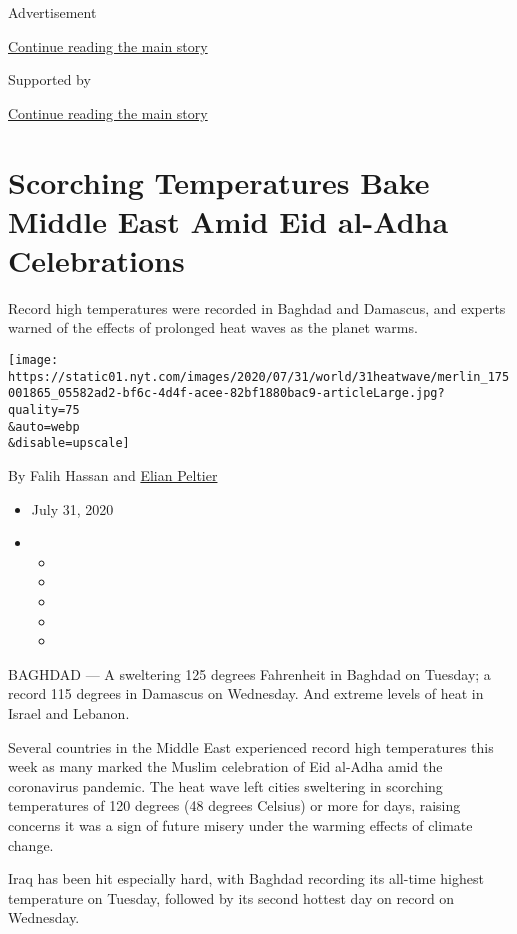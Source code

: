 Advertisement

\protect\hyperlink{after-top}{Continue reading the main story}

Supported by

\protect\hyperlink{after-sponsor}{Continue reading the main story}

\hypertarget{scorching-temperatures-bake-middle-east-amid-eid-al-adha-celebrations}{%
\section{Scorching Temperatures Bake Middle East Amid Eid al-Adha
Celebrations}\label{scorching-temperatures-bake-middle-east-amid-eid-al-adha-celebrations}}

Record high temperatures were recorded in Baghdad and Damascus, and
experts warned of the effects of prolonged heat waves as the planet
warms.

\texttt{[image: https://static01.nyt.com/images/2020/07/31/world/31heatwave/merlin\_175001865\_05582ad2-bf6c-4d4f-acee-82bf1880bac9-articleLarge.jpg?quality=75\\\&auto=webp\\\&disable=upscale]}

By Falih Hassan and
\href{https://www.nytimes.com/by/elian-peltier}{Elian Peltier}

\begin{itemize}
\item
  July 31, 2020
\item
  \begin{itemize}
  \item
  \item
  \item
  \item
  \item
  \end{itemize}
\end{itemize}

BAGHDAD --- A sweltering 125 degrees Fahrenheit in Baghdad on Tuesday; a
record 115 degrees in Damascus on Wednesday. And extreme levels of heat
in Israel and Lebanon.

Several countries in the Middle East experienced record high
temperatures this week as many marked the Muslim celebration of Eid
al-Adha amid the coronavirus pandemic. The heat wave left cities
sweltering in scorching temperatures of 120 degrees (48 degrees Celsius)
or more for days, raising concerns it was a sign of future misery under
the warming effects of climate change.

Iraq has been hit especially hard, with Baghdad recording its all-time
highest temperature on Tuesday, followed by its second hottest day on
record on Wednesday.

